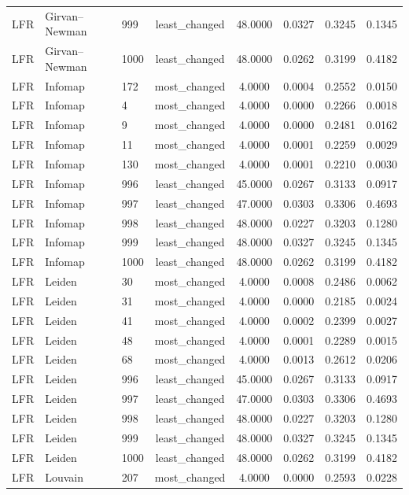 \begin{longtable}{lllccccc}
LFR & Girvan--Newman & 999 & least\_changed & 48.0000 & 0.0327 & 0.3245 & 0.1345 \\
LFR & Girvan--Newman & 1000 & least\_changed & 48.0000 & 0.0262 & 0.3199 & 0.4182 \\
LFR & Infomap & 172 & most\_changed & 4.0000 & 0.0004 & 0.2552 & 0.0150 \\
LFR & Infomap & 4 & most\_changed & 4.0000 & 0.0000 & 0.2266 & 0.0018 \\
LFR & Infomap & 9 & most\_changed & 4.0000 & 0.0000 & 0.2481 & 0.0162 \\
LFR & Infomap & 11 & most\_changed & 4.0000 & 0.0001 & 0.2259 & 0.0029 \\
LFR & Infomap & 130 & most\_changed & 4.0000 & 0.0001 & 0.2210 & 0.0030 \\
LFR & Infomap & 996 & least\_changed & 45.0000 & 0.0267 & 0.3133 & 0.0917 \\
LFR & Infomap & 997 & least\_changed & 47.0000 & 0.0303 & 0.3306 & 0.4693 \\
LFR & Infomap & 998 & least\_changed & 48.0000 & 0.0227 & 0.3203 & 0.1280 \\
LFR & Infomap & 999 & least\_changed & 48.0000 & 0.0327 & 0.3245 & 0.1345 \\
LFR & Infomap & 1000 & least\_changed & 48.0000 & 0.0262 & 0.3199 & 0.4182 \\
LFR & Leiden & 30 & most\_changed & 4.0000 & 0.0008 & 0.2486 & 0.0062 \\
LFR & Leiden & 31 & most\_changed & 4.0000 & 0.0000 & 0.2185 & 0.0024 \\
LFR & Leiden & 41 & most\_changed & 4.0000 & 0.0002 & 0.2399 & 0.0027 \\
LFR & Leiden & 48 & most\_changed & 4.0000 & 0.0001 & 0.2289 & 0.0015 \\
LFR & Leiden & 68 & most\_changed & 4.0000 & 0.0013 & 0.2612 & 0.0206 \\
LFR & Leiden & 996 & least\_changed & 45.0000 & 0.0267 & 0.3133 & 0.0917 \\
LFR & Leiden & 997 & least\_changed & 47.0000 & 0.0303 & 0.3306 & 0.4693 \\
LFR & Leiden & 998 & least\_changed & 48.0000 & 0.0227 & 0.3203 & 0.1280 \\
LFR & Leiden & 999 & least\_changed & 48.0000 & 0.0327 & 0.3245 & 0.1345 \\
LFR & Leiden & 1000 & least\_changed & 48.0000 & 0.0262 & 0.3199 & 0.4182 \\
LFR & Louvain & 207 & most\_changed & 4.0000 & 0.0000 & 0.2593 & 0.0228 \\

\end{longtable}

